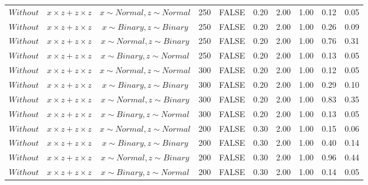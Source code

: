\begin{longtable}{lccccccccc}
  $Without$ & $\textit{x} \times \textit{z} + \textit{z} \times \textit{z}$ & $\textit{x} \sim Normal , \textit{z} \sim Normal$ & 250 & FALSE & 0.20 & 2.00 & 1.00 & 0.12 & 0.05 \\ 
  $Without$ & $\textit{x} \times \textit{z} + \textit{z} \times \textit{z}$ & $\textit{x} \sim Binary, \textit{z} \sim Binary$ & 250 & FALSE & 0.20 & 2.00 & 1.00 & 0.26 & 0.09 \\ 
  $Without$ & $\textit{x} \times \textit{z} + \textit{z} \times \textit{z}$ & $\textit{x} \sim Normal, \textit{z} \sim Binary$ & 250 & FALSE & 0.20 & 2.00 & 1.00 & 0.76 & 0.31 \\ 
  $Without$ & $\textit{x} \times \textit{z} + \textit{z} \times \textit{z}$ & $\textit{x} \sim Binary, \textit{z} \sim Normal$ & 250 & FALSE & 0.20 & 2.00 & 1.00 & 0.13 & 0.05 \\ 
  $Without$ & $\textit{x} \times \textit{z} + \textit{z} \times \textit{z}$ & $\textit{x} \sim Normal , \textit{z} \sim Normal$ & 300 & FALSE & 0.20 & 2.00 & 1.00 & 0.12 & 0.05 \\ 
  $Without$ & $\textit{x} \times \textit{z} + \textit{z} \times \textit{z}$ & $\textit{x} \sim Binary, \textit{z} \sim Binary$ & 300 & FALSE & 0.20 & 2.00 & 1.00 & 0.29 & 0.10 \\ 
  $Without$ & $\textit{x} \times \textit{z} + \textit{z} \times \textit{z}$ & $\textit{x} \sim Normal, \textit{z} \sim Binary$ & 300 & FALSE & 0.20 & 2.00 & 1.00 & 0.83 & 0.35 \\ 
  $Without$ & $\textit{x} \times \textit{z} + \textit{z} \times \textit{z}$ & $\textit{x} \sim Binary, \textit{z} \sim Normal$ & 300 & FALSE & 0.20 & 2.00 & 1.00 & 0.13 & 0.05 \\ 
  $Without$ & $\textit{x} \times \textit{z} + \textit{z} \times \textit{z}$ & $\textit{x} \sim Normal , \textit{z} \sim Normal$ & 200 & FALSE & 0.30 & 2.00 & 1.00 & 0.15 & 0.06 \\ 
  $Without$ & $\textit{x} \times \textit{z} + \textit{z} \times \textit{z}$ & $\textit{x} \sim Binary, \textit{z} \sim Binary$ & 200 & FALSE & 0.30 & 2.00 & 1.00 & 0.40 & 0.14 \\ 
  $Without$ & $\textit{x} \times \textit{z} + \textit{z} \times \textit{z}$ & $\textit{x} \sim Normal, \textit{z} \sim Binary$ & 200 & FALSE & 0.30 & 2.00 & 1.00 & 0.96 & 0.44 \\ 
  $Without$ & $\textit{x} \times \textit{z} + \textit{z} \times \textit{z}$ & $\textit{x} \sim Binary, \textit{z} \sim Normal$ & 200 & FALSE & 0.30 & 2.00 & 1.00 & 0.14 & 0.05 \\ 

\end{longtable}
